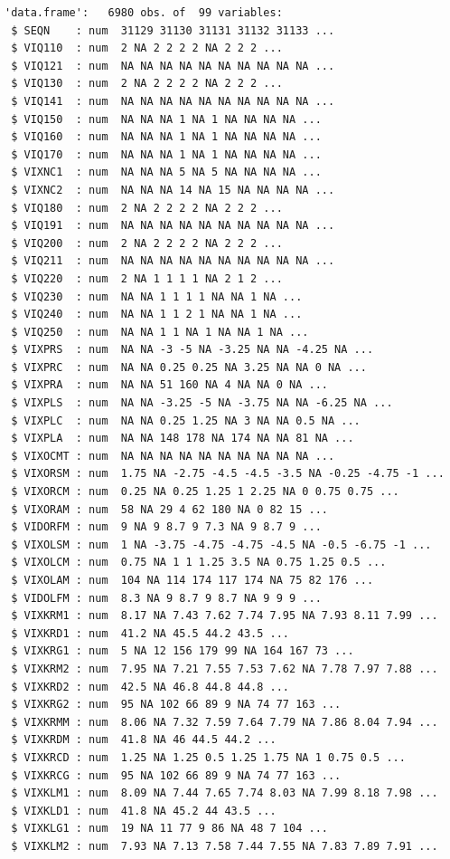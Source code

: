 \documentclass[
  12pt,
]{article}
\begin{document}
\begin{verbatim}
'data.frame':   6980 obs. of  99 variables:
 $ SEQN    : num  31129 31130 31131 31132 31133 ...
 $ VIQ110  : num  2 NA 2 2 2 2 NA 2 2 2 ...
 $ VIQ121  : num  NA NA NA NA NA NA NA NA NA NA ...
 $ VIQ130  : num  2 NA 2 2 2 2 NA 2 2 2 ...
 $ VIQ141  : num  NA NA NA NA NA NA NA NA NA NA ...
 $ VIQ150  : num  NA NA NA 1 NA 1 NA NA NA NA ...
 $ VIQ160  : num  NA NA NA 1 NA 1 NA NA NA NA ...
 $ VIQ170  : num  NA NA NA 1 NA 1 NA NA NA NA ...
 $ VIXNC1  : num  NA NA NA 5 NA 5 NA NA NA NA ...
 $ VIXNC2  : num  NA NA NA 14 NA 15 NA NA NA NA ...
 $ VIQ180  : num  2 NA 2 2 2 2 NA 2 2 2 ...
 $ VIQ191  : num  NA NA NA NA NA NA NA NA NA NA ...
 $ VIQ200  : num  2 NA 2 2 2 2 NA 2 2 2 ...
 $ VIQ211  : num  NA NA NA NA NA NA NA NA NA NA ...
 $ VIQ220  : num  2 NA 1 1 1 1 NA 2 1 2 ...
 $ VIQ230  : num  NA NA 1 1 1 1 NA NA 1 NA ...
 $ VIQ240  : num  NA NA 1 1 2 1 NA NA 1 NA ...
 $ VIQ250  : num  NA NA 1 1 NA 1 NA NA 1 NA ...
 $ VIXPRS  : num  NA NA -3 -5 NA -3.25 NA NA -4.25 NA ...
 $ VIXPRC  : num  NA NA 0.25 0.25 NA 3.25 NA NA 0 NA ...
 $ VIXPRA  : num  NA NA 51 160 NA 4 NA NA 0 NA ...
 $ VIXPLS  : num  NA NA -3.25 -5 NA -3.75 NA NA -6.25 NA ...
 $ VIXPLC  : num  NA NA 0.25 1.25 NA 3 NA NA 0.5 NA ...
 $ VIXPLA  : num  NA NA 148 178 NA 174 NA NA 81 NA ...
 $ VIXOCMT : num  NA NA NA NA NA NA NA NA NA NA ...
 $ VIXORSM : num  1.75 NA -2.75 -4.5 -4.5 -3.5 NA -0.25 -4.75 -1 ...
 $ VIXORCM : num  0.25 NA 0.25 1.25 1 2.25 NA 0 0.75 0.75 ...
 $ VIXORAM : num  58 NA 29 4 62 180 NA 0 82 15 ...
 $ VIDORFM : num  9 NA 9 8.7 9 7.3 NA 9 8.7 9 ...
 $ VIXOLSM : num  1 NA -3.75 -4.75 -4.75 -4.5 NA -0.5 -6.75 -1 ...
 $ VIXOLCM : num  0.75 NA 1 1 1.25 3.5 NA 0.75 1.25 0.5 ...
 $ VIXOLAM : num  104 NA 114 174 117 174 NA 75 82 176 ...
 $ VIDOLFM : num  8.3 NA 9 8.7 9 8.7 NA 9 9 9 ...
 $ VIXKRM1 : num  8.17 NA 7.43 7.62 7.74 7.95 NA 7.93 8.11 7.99 ...
 $ VIXKRD1 : num  41.2 NA 45.5 44.2 43.5 ...
 $ VIXKRG1 : num  5 NA 12 156 179 99 NA 164 167 73 ...
 $ VIXKRM2 : num  7.95 NA 7.21 7.55 7.53 7.62 NA 7.78 7.97 7.88 ...
 $ VIXKRD2 : num  42.5 NA 46.8 44.8 44.8 ...
 $ VIXKRG2 : num  95 NA 102 66 89 9 NA 74 77 163 ...
 $ VIXKRMM : num  8.06 NA 7.32 7.59 7.64 7.79 NA 7.86 8.04 7.94 ...
 $ VIXKRDM : num  41.8 NA 46 44.5 44.2 ...
 $ VIXKRCD : num  1.25 NA 1.25 0.5 1.25 1.75 NA 1 0.75 0.5 ...
 $ VIXKRCG : num  95 NA 102 66 89 9 NA 74 77 163 ...
 $ VIXKLM1 : num  8.09 NA 7.44 7.65 7.74 8.03 NA 7.99 8.18 7.98 ...
 $ VIXKLD1 : num  41.8 NA 45.2 44 43.5 ...
 $ VIXKLG1 : num  19 NA 11 77 9 86 NA 48 7 104 ...
 $ VIXKLM2 : num  7.93 NA 7.13 7.58 7.44 7.55 NA 7.83 7.89 7.91 ...

\end{verbatim}
\end{document}
